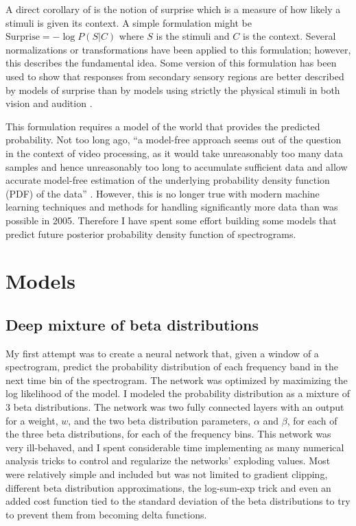A direct corollary of \PC is the notion of surprise which is a measure of how likely a stimuli is given its context. A simple formulation might be $\text{Surprise}=-\log P(S|C)$ where $S$ is the stimuli and $C$ is the context. Several normalizations or transformations have been applied to this formulation; however, this describes the fundamental idea. Some version of this formulation has been used to show that responses from secondary sensory regions are better described by models of surprise than by models using strictly the physical stimuli in both vision \cite{itti2005principled} and audition \cite{Gill2008}.

This formulation requires a model of the world that provides the predicted probability. Not too long ago, ``a model-free approach seems out of the question in the context of video processing, as it would take unreasonably too many data samples and hence unreasonably too long to accumulate sufficient data and allow accurate model-free estimation of the underlying probability density function (PDF) of the data'' \cite{itti2005principled}. However, this is no longer true with modern machine learning techniques and methods for handling significantly more data than was possible in 2005. Therefore I have spent some effort building some models that predict future posterior probability density function of spectrograms.

\section{Models}

\subsection{Deep mixture of beta distributions}
My first attempt was to create a neural network that, given a window of a spectrogram, predict the probability distribution of each frequency band in the next time bin of the spectrogram. The network was optimized by maximizing the log likelihood of the model. I modeled the probability distribution as a mixture of 3 beta distributions. The network was two fully connected layers with an output for a weight, $w$, and the two beta distribution parameters, $\alpha$ and $\beta$, for each of the three beta distributions, for each of the frequency bins. This network was very ill-behaved, and I spent considerable time implementing as many numerical analysis tricks to control and regularize the networks' exploding values. Most were relatively simple and included but was not limited to gradient clipping, different beta distribution approximations, the log-sum-exp trick and even an added cost function tied to the standard deviation of the beta distributions to try to prevent them from becoming delta functions.

